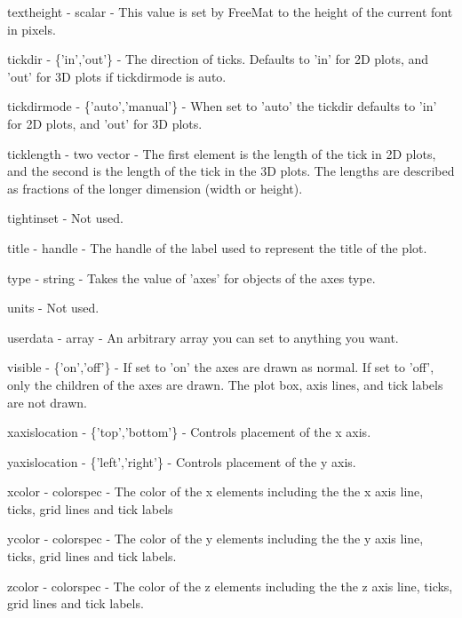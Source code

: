 \begin{DoxyItemize}
\item {\ttfamily textheight} -\/ {\ttfamily scalar} -\/ This value is set by Free\-Mat to the height of the current font in pixels.  
\item {\ttfamily tickdir} -\/ {\ttfamily \{'in','out'\}} -\/ The direction of ticks. Defaults to {\ttfamily 'in'} for 2\-D plots, and {\ttfamily 'out'} for 3\-D plots if {\ttfamily tickdirmode} is {\ttfamily auto}.  
\item {\ttfamily tickdirmode} -\/ {\ttfamily \{'auto','manual'\}} -\/ When set to {\ttfamily 'auto'} the {\ttfamily tickdir} defaults to {\ttfamily 'in'} for 2\-D plots, and {\ttfamily 'out'} for 3\-D plots.  
\item {\ttfamily ticklength} -\/ {\ttfamily two vector} -\/ The first element is the length of the tick in 2\-D plots, and the second is the length of the tick in the 3\-D plots. The lengths are described as fractions of the longer dimension (width or height).  
\item {\ttfamily tightinset} -\/ Not used.  
\item {\ttfamily title} -\/ {\ttfamily handle} -\/ The handle of the label used to represent the title of the plot.  
\item {\ttfamily type} -\/ {\ttfamily string} -\/ Takes the value of {\ttfamily 'axes'} for objects of the axes type.  
\item {\ttfamily units} -\/ Not used.  
\item {\ttfamily userdata} -\/ {\ttfamily array} -\/ An arbitrary array you can set to anything you want.  
\item {\ttfamily visible} -\/ {\ttfamily \{'on','off'\}} -\/ If set to {\ttfamily 'on'} the axes are drawn as normal. If set to {\ttfamily 'off'}, only the children of the axes are drawn. The plot box, axis lines, and tick labels are not drawn.  
\item {\ttfamily xaxislocation} -\/ {\ttfamily \{'top','bottom'\}} -\/ Controls placement of the x axis.  
\item {\ttfamily yaxislocation} -\/ {\ttfamily \{'left','right'\}} -\/ Controls placement of the y axis.  
\item {\ttfamily xcolor} -\/ {\ttfamily colorspec} -\/ The color of the x elements including the the x axis line, ticks, grid lines and tick labels  
\item {\ttfamily ycolor} -\/ {\ttfamily colorspec} -\/ The color of the y elements including the the y axis line, ticks, grid lines and tick labels.  
\item {\ttfamily zcolor} -\/ {\ttfamily colorspec} -\/ The color of the z elements including the the z axis line, ticks, grid lines and tick labels.  

\end{DoxyItemize}
